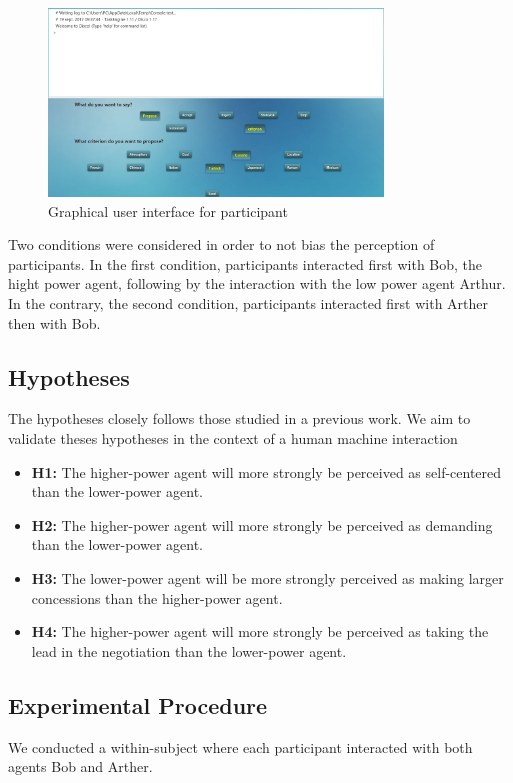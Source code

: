 \documentclass[runningheads,a4paper]{llncs}
\begin{document}
		\begin{figure}
			\centering
			\includegraphics[width=3.5in]{graphs/ihm.png}
			\caption{Graphical user interface for participant}
			\label{ihm}
		\end{figure}
		
		Two conditions were considered in order to not bias the perception of participants. In the first condition, participants interacted first with Bob, the hight power agent, following by the interaction with the low power agent Arthur. In the contrary, the second condition, participants interacted first with Arther then with Bob. 
		 
		\subsection{Hypotheses}
			The hypotheses closely follows those studied in a previous work. We aim to validate theses hypotheses in the context of a human machine interaction
			
			\begin{itemize}
					\item  \textbf{H1:} The higher-power agent will more strongly be perceived as self-centered than the lower-power agent.  
					
					\item \textbf{H2:}  The higher-power agent will more strongly be perceived as demanding than the lower-power agent.
										
					\item \textbf{H3:} The lower-power agent will be more strongly perceived as making larger concessions than the higher-power agent.
					
					\item \textbf{H4:}  The higher-power agent will more strongly be perceived as taking the lead in the negotiation than the lower-power agent.
					
				\end{itemize}
				
		\subsection{Experimental Procedure}
		We conducted a within-subject where each participant interacted with both  agents Bob and Arther.
		
\end{document}
